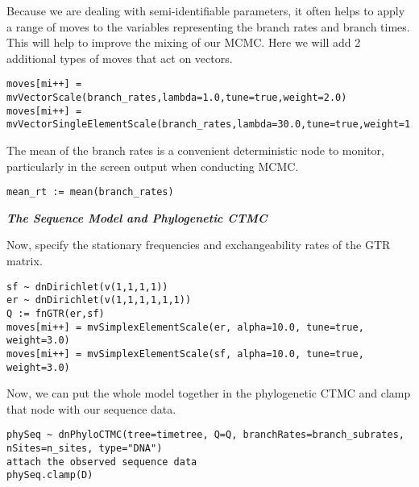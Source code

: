 Because we are dealing with semi-identifiable parameters, it often helps to apply a range of moves to the variables representing the branch rates and branch times. This will help to improve the mixing of our MCMC.
Here we will add 2 additional types of moves that act on vectors.
{\tt \begin{snugshade*}
\begin{lstlisting}
moves[mi++] = mvVectorScale(branch_rates,lambda=1.0,tune=true,weight=2.0) 
moves[mi++] = mvVectorSingleElementScale(branch_rates,lambda=30.0,tune=true,weight=1.0) 
\end{lstlisting}
\end{snugshade*}}


The mean of the branch rates is a convenient deterministic node to monitor, particularly in the screen output when conducting MCMC.
{\tt \begin{snugshade*}
\begin{lstlisting}
mean_rt := mean(branch_rates) 
\end{lstlisting}
\end{snugshade*}}

\textbf{\textit{The Sequence Model and Phylogenetic CTMC}}

Now, specify the stationary frequencies and exchangeability rates of the GTR matrix.
{\tt \begin{snugshade*}
\begin{lstlisting}
sf ~ dnDirichlet(v(1,1,1,1))
er ~ dnDirichlet(v(1,1,1,1,1,1))
Q := fnGTR(er,sf)
moves[mi++] = mvSimplexElementScale(er, alpha=10.0, tune=true, weight=3.0)
moves[mi++] = mvSimplexElementScale(sf, alpha=10.0, tune=true, weight=3.0)
\end{lstlisting}
\end{snugshade*}}

Now, we can put the whole model together in the phylogenetic CTMC and clamp that node with our sequence data.
{\tt \begin{snugshade*}
\begin{lstlisting}
phySeq ~ dnPhyloCTMC(tree=timetree, Q=Q, branchRates=branch_subrates, nSites=n_sites, type="DNA")
attach the observed sequence data
phySeq.clamp(D)
\end{lstlisting}
\end{snugshade*}}

